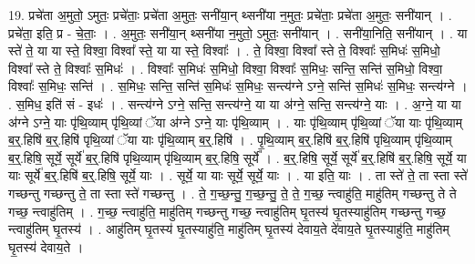 \documentclass[17pt]{extarticle}
\begin{document}
19. प्रचे॑ता अ॒मुतो॒ ऽमुतः॒ प्रचे॑ताः॒ प्रचे॑ता अ॒मुतः॒ सनी॑या॒न् थ्सनी॑या न॒मुतः॒ प्रचे॑ताः॒ प्रचे॑ता अ॒मुतः॒ सनी॑यान् । . प्रचे॑ता॒ इति॒ प्र - चे॒ताः॒ । . अ॒मुतः॒ सनी॑या॒न् थ्सनी॑या न॒मुतो॒ ऽमुतः॒ सनी॑यान् । . सनी॑या॒निति॒ सनी॑यान् । . या स्ते॑ ते॒ या या स्ते॒ विश्वा॒ विश्वा᳚ स्ते॒ या या स्ते॒ विश्वाः᳚ । . ते॒ विश्वा॒ विश्वा᳚ स्ते ते॒ विश्वाः᳚ स॒मिधः॑ स॒मिधो॒ विश्वा᳚ स्ते ते॒ विश्वाः᳚ स॒मिधः॑ । . विश्वाः᳚ स॒मिधः॑ स॒मिधो॒ विश्वा॒ विश्वाः᳚ स॒मिधः॒ सन्ति॒ सन्ति॑ स॒मिधो॒ विश्वा॒ विश्वाः᳚ स॒मिधः॒ सन्ति॑ । . स॒मिधः॒ सन्ति॒ सन्ति॑ स॒मिधः॑ स॒मिधः॒ सन्त्य॑ग्ने ऽग्ने॒ सन्ति॑ स॒मिधः॑ स॒मिधः॒ सन्त्य॑ग्ने । . स॒मिध॒ इति॑ सं - इधः॑ । . सन्त्य॑ग्ने ऽग्ने॒ सन्ति॒ सन्त्य॑ग्ने॒ या या अ॑ग्ने॒ सन्ति॒ सन्त्य॑ग्ने॒ याः । . अ॒ग्ने॒ या या अ॑ग्ने ऽग्ने॒ याः पृ॑थि॒व्याम् पृ॑थि॒व्यां ॅया अ॑ग्ने ऽग्ने॒ याः पृ॑थि॒व्याम् । . याः पृ॑थि॒व्याम् पृ॑थि॒व्यां ॅया याः पृ॑थि॒व्याम् ब॒र्॒.हिषि॑ ब॒र्॒.हिषि॑ पृथि॒व्यां ॅया याः पृ॑थि॒व्याम् ब॒र्॒.हिषि॑ । . पृ॒थि॒व्याम् ब॒र्॒.हिषि॑ ब॒र्॒.हिषि॑ पृथि॒व्याम् पृ॑थि॒व्याम् ब॒र्॒.हिषि॒ सूर्ये॒ सूर्ये॑ ब॒र्॒.हिषि॑ पृथि॒व्याम् पृ॑थि॒व्याम् ब॒र्॒.हिषि॒ सूर्ये᳚ । . ब॒र्॒.हिषि॒ सूर्ये॒ सूर्ये॑ ब॒र्॒.हिषि॑ ब॒र्॒.हिषि॒ सूर्ये॒ या याः सूर्ये॑ ब॒र्॒.हिषि॑ ब॒र्॒.हिषि॒ सूर्ये॒ याः । . सूर्ये॒ या याः सूर्ये॒ सूर्ये॒ याः । . या इति॒ याः । . ता स्ते॑ ते॒ ता स्ता स्ते॑ गच्छन्तु गच्छन्तु ते॒ ता स्ता स्ते॑ गच्छन्तु । . ते॒ ग॒च्छ॒न्तु॒ ग॒च्छ॒न्तु॒ ते॒ ते॒ ग॒च्छ॒ न्त्वाहु॑ति॒ माहु॑तिम् गच्छन्तु ते ते गच्छ॒ न्त्वाहु॑तिम् । . ग॒च्छ॒ न्त्वाहु॑ति॒ माहु॑तिम् गच्छन्तु गच्छ॒ न्त्वाहु॑तिम् घृ॒तस्य॑ घृ॒तस्याहु॑तिम् गच्छन्तु गच्छ॒ न्त्वाहु॑तिम् घृ॒तस्य॑ । . आहु॑तिम् घृ॒तस्य॑ घृ॒तस्याहु॑ति॒ माहु॑तिम् घृ॒तस्य॑ देवाय॒ते दे॑वाय॒ते घृ॒तस्याहु॑ति॒ माहु॑तिम् घृ॒तस्य॑ देवाय॒ते । \newline
\end{document}
